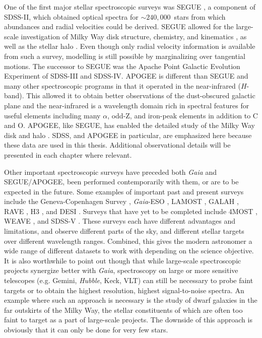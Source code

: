 One of the first major stellar spectroscopic surveys was SEGUE \parencite{segue}, a component of SDSS-II, which obtained optical spectra for $\sim 240,000$~stars from which abundances and radial velocities could be derived. SEGUE allowed for the large-scale investigation of Milky Way disk structure, chemistry, and kinematics \parencite[e.g.][]{bovy12c,bovy12d,schonrich12,bovy13}, as well as the stellar halo \parencite[e.g.][]{ivezic08,bond10}. Even though only radial velocity information is available from such a survey, modelling is still possible by marginalizing over tangential motions. The successor to SEGUE was the Apache Point Galactic Evolution Experiment \parencite[APOGEE][]{apogee} of SDSS-III and SDSS-IV. APOGEE is different than SEGUE and many other spectroscopic programs in that it operated in the near-infrared ($H$-band). This allowed it to obtain better observations of the dust-obscured galactic plane and the near-infrared is a wavelength domain rich in spectral features for useful elements including many $\alpha$, odd-Z, and iron-peak elements in addition to C and O. APOGEE, like SEGUE, has enabled the detailed study of the Milky Way disk and halo \parencite[see][for a few examples of noteworthy results]{bovy12a,hayden15,mackereth19a}. SDSS, and APOGEE in particular, are emphasized here because these data are used in this thesis. Additional observational details will be presented in each chapter where relevant.

Other important spectroscopic surveys have preceded both \textit{Gaia} and SEGUE/APOGEE, been performed contemporarily with them, or are to be expected in the future. Some examples of important past and present surveys include the Geneva-Copenhagen Survey \parencite{gcs}, \textit{Gaia}-ESO \parencite{gaiaeso}, LAMOST \parencite{lamost}, GALAH \parencite{galah}, RAVE \parencite{ravedr16}, H3 \parencite{h3}, and DESI \parencite{desi}. Surveys that have yet to be completed include 4MOST \parencite{4most}, WEAVE \parencite{weave}, and SDSS-V \parencite{sdss5}. These surveys each have different advantages and limitations, and observe different parts of the sky, and different stellar targets over different wavelength ranges. Combined, this gives the modern astronomer a wide range of different datasets to work with depending on the science objective. It is also worthwhile to point out though that while large-scale spectroscopic projects synergize better with \textit{Gaia}, spectroscopy on large or more sensitive telescopes (e.g. Gemini, \textit{Hubble}, Keck, VLT) can still be necessary to probe faint targets or to obtain the highest resolution, highest signal-to-noise spectra. An example where such an approach is necessary is the study of dwarf galaxies in the far outskirts of the Milky Way, the stellar constituents of which are often too faint to target as a part of large-scale projects. The downside of this approach is obviously that it can only be done for very few stars.

